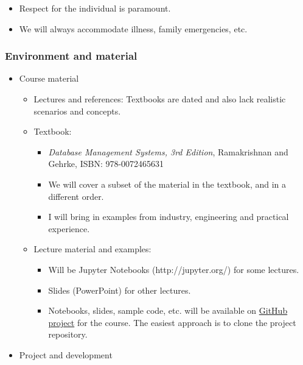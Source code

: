 \documentclass[11pt]{article}
\providecommand{\tightlist}{%
      \setlength{\itemsep}{0pt}\setlength{\parskip}{0pt}}
\begin{document}
\begin{itemize}
\begin{itemize}
    \begin{itemize}
    \tightlist
    \item
      Respect for the individual is paramount.
    \item
      We will always accommodate illness, family emergencies, etc.
    \end{itemize}
  \end{itemize}
\end{itemize}

    \subsubsection{Environment and material}\label{environment-and-material}

\begin{itemize}
\tightlist
\item
  Course material

  \begin{itemize}
  \tightlist
  \item
    Lectures and references: Textbooks are dated and also lack realistic
    scenarios and concepts.
  \item
    Textbook:

    \begin{itemize}
    \tightlist
    \item
      \emph{Database Management Systems, 3rd Edition}, Ramakrishnan and
      Gehrke, ISBN: 978-0072465631
    \item
      We will cover a subset of the material in the textbook, and in a
      different order.
    \item
      I will bring in examples from industry, engineering and practical
      experience.
    \end{itemize}
  \item
    Lecture material and examples:

    \begin{itemize}
    \tightlist
    \item
      Will be Jupyter Notebooks (http://jupyter.org/) for some lectures.
    \item
      Slides (PowerPoint) for other lectures.
    \item
      Notebooks, slides, sample code, etc. will be available on
      \href{https://github.com/donald-f-ferguson/w4111-Databases}{GitHub
      project} for the course. The easiest approach is to clone the
      project repository.
    \end{itemize}
  \end{itemize}
\item
  Project and development


\end{itemize}
\end{document}
